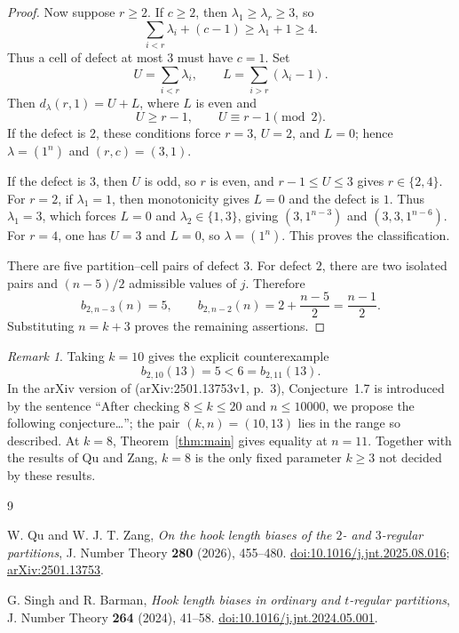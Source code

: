 \documentclass[11pt]{amsart}
\theoremstyle{remark}
\newtheorem{remark}[theorem]{Remark}
\begin{document}
\begin{proof}
Now suppose $r\ge2$.  If $c\ge2$, then $\lambda_1\ge\lambda_r\ge3$, so
\[
 \sum_{i<r}\lambda_i+(c-1)\ge\lambda_1+1\ge4.
\]
Thus a cell of defect at most $3$ must have $c=1$.  Set
\[
 U=\sum_{i<r}\lambda_i,
 \qquad
 L=\sum_{i>r}(\lambda_i-1).
\]
Then $d_\lambda(r,1)=U+L$, where $L$ is even and
\[
 U\ge r-1,
 \qquad
 U\equiv r-1\pmod 2.
\]
If the defect is $2$, these conditions force $r=3$, $U=2$, and $L=0$;
hence $\lambda=(1^n)$ and $(r,c)=(3,1)$.

If the defect is $3$, then $U$ is odd, so $r$ is even, and
$r-1\le U\le3$ gives $r\in\{2,4\}$.  For $r=2$, if
$\lambda_1=1$, then monotonicity gives $L=0$ and the defect is $1$.
Thus $\lambda_1=3$, which forces $L=0$ and
$\lambda_2\in\{1,3\}$, giving
$(3,1^{n-3})$ and $(3,3,1^{n-6})$.  For $r=4$, one has $U=3$ and
$L=0$, so $\lambda=(1^n)$.  This proves the classification.

There are five partition--cell pairs of defect $3$.  For defect $2$,
there are two isolated pairs and $(n-5)/2$ admissible values of $j$.
Therefore
\[
 b_{2,n-3}(n)=5,
 \qquad
 b_{2,n-2}(n)=2+\frac{n-5}{2}=\frac{n-1}{2}.
\]
Substituting $n=k+3$ proves the remaining assertions.
\end{proof}

\begin{remark}
Taking $k=10$ gives the explicit counterexample
\[
 b_{2,10}(13)=5<6=b_{2,11}(13).
\]
In the arXiv version of \cite{QuZang} (arXiv:2501.13753v1, p.~3),
Conjecture~1.7 is introduced by the sentence ``After checking
$8\le k\le20$ and $n\le10000$, we propose the following
conjecture\dots''; the pair $(k,n)=(10,13)$ lies in the range so
described.  At $k=8$,
Theorem~\ref{thm:main} gives equality at $n=11$.  Together with the
results of Qu and Zang, $k=8$ is the only fixed parameter $k\ge3$ not
decided by these results.
\end{remark}

\begin{thebibliography}{9}

W. Qu and W. J. T. Zang,
\emph{On the hook length biases of the $2$- and $3$-regular partitions},
J. Number Theory \textbf{280} (2026), 455--480.
\href{https://doi.org/10.1016/j.jnt.2025.08.016}
{doi:10.1016/j.jnt.2025.08.016};
\href{https://arxiv.org/abs/2501.13753}{arXiv:2501.13753}.

G. Singh and R. Barman,
\emph{Hook length biases in ordinary and $t$-regular partitions},
J. Number Theory \textbf{264} (2024), 41--58.
\href{https://doi.org/10.1016/j.jnt.2024.05.001}
{doi:10.1016/j.jnt.2024.05.001}.

\end{thebibliography}
\end{document}
